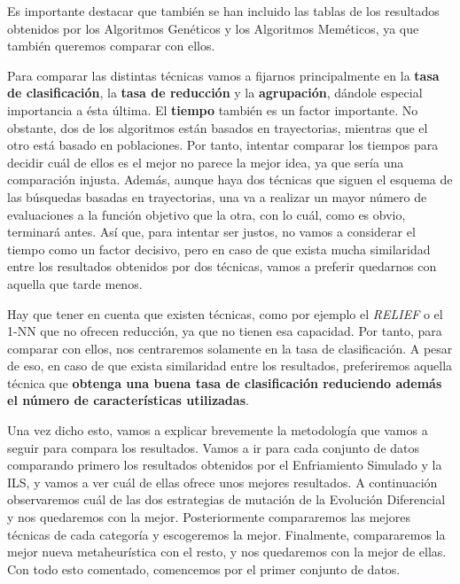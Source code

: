 \documentclass[11pt,a4paper]{article}
\begin{document}
Es importante destacar que también se han incluido las tablas de los resultados obtenidos por los Algoritmos Genéticos y los
Algoritmos Meméticos, ya que también queremos comparar con ellos.

Para comparar las distintas técnicas vamos a fijarnos principalmente en la \textbf{tasa de clasificación}, la \textbf{tasa de
reducción} y la \textbf{agrupación}, dándole especial importancia a ésta última. El \textbf{tiempo} también es un factor importante.
No obstante, dos de los algoritmos están basados en trayectorias, mientras que el otro está basado en poblaciones. Por tanto,
intentar comparar los tiempos para decidir cuál de ellos es el mejor no parece la mejor idea, ya que sería una comparación injusta.
Además, aunque haya dos técnicas que siguen el esquema de las búsquedas basadas en trayectorias, una va a realizar un mayor número
de evaluaciones a la función objetivo que la otra, con lo cuál, como es obvio, terminará antes. Así que, para intentar ser justos,
no vamos a considerar el tiempo como un factor decisivo, pero en caso de que exista mucha similaridad entre los resultados obtenidos
por dos técnicas, vamos a preferir quedarnos con aquella que tarde menos.

Hay que tener en cuenta que existen técnicas, como por ejemplo el \textit{RELIEF} o el 1-NN que no ofrecen reducción, ya que no
tienen esa capacidad. Por tanto, para comparar con ellos, nos centraremos solamente en la tasa de clasificación. A pesar de eso,
en caso de que exista similaridad entre los resultados, preferiremos aquella técnica que \textbf{obtenga una buena tasa de
clasificación reduciendo además el número de características utilizadas}.

Una vez dicho esto, vamos a explicar brevemente la metodología que vamos a seguir para compara los resultados. Vamos a ir para cada
conjunto de datos comparando primero los resultados obtenidos por el Enfriamiento Simulado y la ILS, y vamos a ver cuál de ellas
ofrece unos mejores resultados. A continuación observaremos cuál de las dos estrategias de mutación de la Evolución Diferencial
y nos quedaremos con la mejor. Posteriormente compararemos las mejores técnicas de cada categoría y escogeremos la mejor.
Finalmente, compararemos la mejor nueva metaheurística con el resto, y nos quedaremos con la mejor de ellas. Con todo esto
comentado, comencemos por el primer conjunto de datos.
\end{document}
